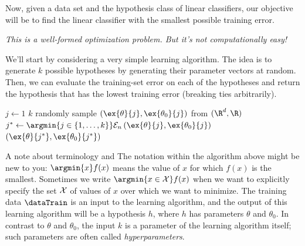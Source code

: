 Now, given a data set and the hypothesis class of linear classifiers,
our objective will be to find the linear classifier with the smallest
possible training error.

  {\em This is a well-formed optimization problem. But it's not
    computationally easy!}

We'll start by considering a very simple learning algorithm.   The idea is to generate $k$ possible
hypotheses by generating their parameter vectors at random.  Then, we
can evaluate the training-set error on each of the hypotheses and
return the hypothesis that has the lowest training error (breaking
ties arbitrarily).

\begin{codebox}
  \li \For $j \gets 1$ \To $k$
  \li   \Do
  randomly sample $\left(\ex{\theta}{j},
    \ex{\theta_0}{j}\right)$ from $(\R^d, \R)$
  \End
  \li $j^* \gets \argmin{j \in \{1, \ldots, k\}} \mathcal{E}_n \left(\ex{\theta}{j}, \ex{\theta_0}{j}\right)$
  \li \Return $\left(\ex{\theta}{j^*}, \ex{\theta_0}{j^*}\right)$
\end{codebox}



A note about terminology and
{The notation within the algorithm above might be new to you:
  $\argmin{x} f(x)$
  means the value of $x$ for which $f(x)$ is the smallest.  Sometimes
  we write $\argmin{x \in {\cal X}} f(x)$ when we want to explicitly
  specify the set ${\cal X}$ of values of $x$ over which we want to
  minimize.}
The training data $\dataTrain$ is an input to the learning algorithm,
and the output of this learning algorithm will be a hypothesis $h$, where
$h$ has parameters $\theta$ and $\theta_{0}.$
In contrast to $\theta$ and $\theta_{0}$, the input $k$ is a
parameter of the learning algorithm itself; such
parameters are often called {\em hyperparameters}.



